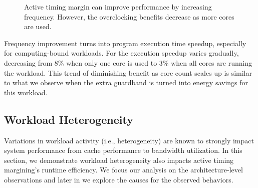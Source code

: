 \begin{figure}
\centering
    \caption{Active timing margin can improve performance by increasing frequency. However, the overclocking benefits decrease as more cores are used.}
    \label{fig:lucb-inefficiency}
 \end{figure}

Frequency improvement turns into program execution time speedup, especially for computing-bound workloads. For  the execution speedup varies gradually, decreasing from 8\% when only one core is used to 3\% when all cores are running the workload. This trend of diminishing benefit as core count scales up is similar to what we observe when the extra guardband is turned into energy savings for this workload. 

\subsection{Workload Heterogeneity}
\label{sec:voltage:characterization:workload-variation}

Variations in workload activity (i.e., heterogeneity) are known to strongly impact system performance from cache performance to bandwidth utilization. In this section, we demonstrate workload heterogeneity also impacts active timing margining's runtime efficiency. We focus our analysis on the architecture-level observations and later in  we explore the causes for the observed behaviors.

